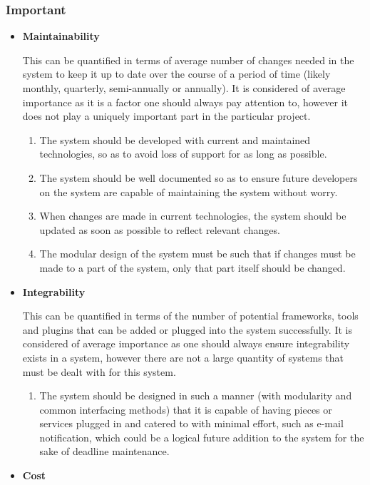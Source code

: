 \documentclass[hidelinks,a4paper,12pt]{article}
\begin{document}
			\subsubsection{Important}
			\begin{itemize}
				\item \textbf{Maintainability}
				
				This can be quantified in terms of average number of changes needed in the system to keep it up to date over the course of a period of time (likely monthly, quarterly, semi-annually or annually). It is considered of average importance as it is a factor one should always pay attention to, however it does not play a uniquely important part in the particular project. 
				\begin{enumerate}
					\item The system should be developed with current and maintained technologies, so as to avoid loss of support for as long as possible.
					\item The system should be well documented so as to ensure future developers on the system are capable of maintaining the system without worry.
					\item When changes are made in current technologies, the system should be updated as soon as possible to reflect relevant changes.
					\item The modular design of the system must be such that if changes must be made to a part of the system, only that part itself should be changed.
				\end{enumerate}
				\item \textbf{Integrability}
				
				This can be quantified in terms of the number of potential frameworks, tools and plugins that can be added or plugged into the system successfully. It is considered of average importance as one should always ensure integrability exists in a system, however there are not a large quantity of systems that must be dealt with for this system.
				\begin{enumerate}
					\item The system should be designed in such a manner (with modularity and common interfacing methods) that it is capable of having pieces or services plugged in and catered to with minimal effort, such as e-mail notification, which could be a logical future addition to the system for the sake of deadline maintenance.
				\end{enumerate}
				\item \textbf{Cost}
				

\end{itemize}
\end{document}
